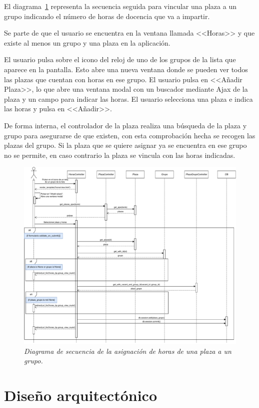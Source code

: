 \begin{itemize}
El diagrama~\ref{DS-asignarHoras} representa la secuencia seguida para vincular una plaza a un grupo indicando el número de horas de docencia que va a impartir.

Se parte de que el usuario se encuentra en la ventana llamada <<Horas>> y que existe al menos un grupo y una plaza en la aplicación. 

El usuario pulsa sobre el icono del reloj de uno de los grupos de la lista que aparece en la pantalla. Esto abre una nueva ventana donde se pueden ver todos las plazas que cuentan con horas en ese grupo. El usuario pulsa en <<Añadir Plaza>>, lo que abre una ventana modal con un buscador mediante Ajax de la plaza y un campo para indicar las horas. El usuario selecciona una plaza e indica las horas y pulsa en <<Añadir>>.

De forma interna, el controlador de la plaza realiza una búsqueda de la plaza y grupo para asegurarse de que existen, con esta comprobación hecha se recogen las plazas del grupo. 
Si la plaza que se quiere asignar ya se encuentra en ese grupo no se permite, en caso contrario la plaza se vincula con las horas indicadas.

\begin{figure}
	\centering
	\includegraphics[width=\textwidth]{../img/Anexos/Diagramas secuencia/DS - asignar horas.pdf}
	\caption{\textit{Diagrama de secuencia de la asignación de horas de una plaza a un grupo.}}\label{DS-asignarHoras}
\end{figure}


\end{itemize}



\section{Diseño arquitectónico}


